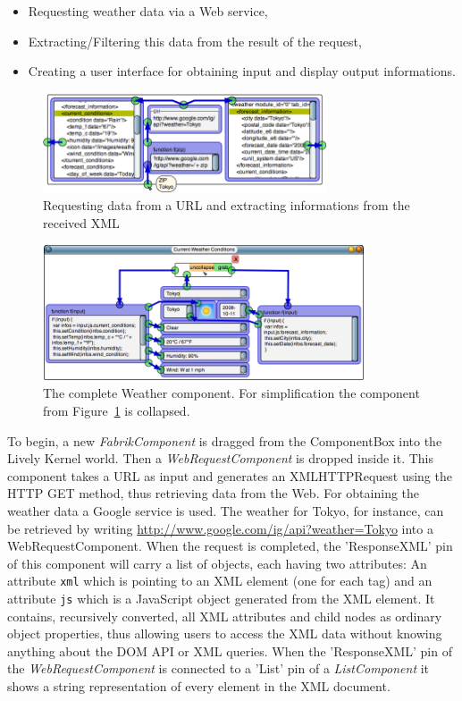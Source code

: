 \documentclass[pdftex, times, 10pt, twocolumn]{article}
\begin{document}
\begin{itemize}
  \item Requesting weather data via a Web service, 
  \item Extracting/Filtering this data from the result of the request, 
  \item Creating a user interface for obtaining input and display output informations. 
\end{itemize}


\begin{figure}[t]\centering
\includegraphics[width=0.750000\textwidth]{weatherExample09.png} 

\caption{Requesting data from a URL and extracting informations from the received XML }
\label{fig:WebrequestInWeatherExample}
\end{figure}


\begin{figure}[]\centering
\includegraphics[width=0.850000\textwidth]{weatherExample07.png} 

\caption{The complete Weather component. For simplification the component from Figure~\ref{fig:WebrequestInWeatherExample} is collapsed. }
\label{fig:ExapandedSimplifiedWeatherExample}
\end{figure}
To begin, a new {\em FabrikComponent} is dragged from the ComponentBox into the Lively Kernel world. Then a {\em WebRequestComponent} is dropped inside it. This component takes a URL as input and generates an XMLHTTPRequest using the HTTP GET method, thus retrieving data from the Web. For obtaining the weather data a Google service is used. The weather for Tokyo, for instance, can be retrieved by writing \url{http://www.google.com/ig/api?weather=Tokyo} into a WebRequestComponent. When the request is completed, the 'ResponseXML' pin of this component will carry a list of objects, each having two attributes: An attribute {\tt xml} which is pointing to an XML element (one for each tag) and an attribute {\tt js} which is a JavaScript object generated from the XML element. It contains, recursively converted, all XML attributes and child nodes as ordinary object properties, thus allowing users to access the XML data without knowing anything about the DOM API or XML queries. When the 'ResponseXML' pin of the {\em WebRequestComponent} is connected to a 'List' pin of a {\em ListComponent} it shows a string representation of every element in the XML document. 
\end{document}
